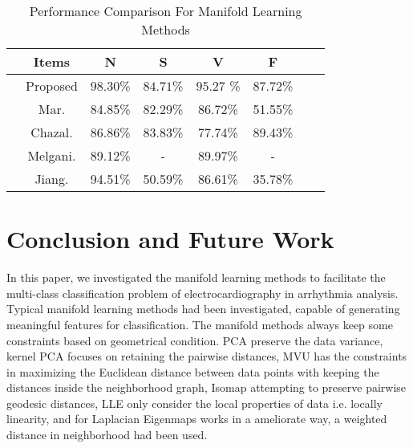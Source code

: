 \documentclass[journal]{IEEEtran}
\begin{document}
\begin{table}[!htbp]
\begin{center}
\begin{threeparttable}
\caption{Performance Comparison For Manifold Learning Methods}
\label{table1}
\begin{tabular}{cccccccc}
\hline
&  Items & N & S & V & F   \\
\hline

&Proposed &$\bm{98.30}$\% & $\bm{84.71}$\% & $\bm{95.27}$ \%& $\bm{87.72}$\%\\
& Mar. \cite{mar}  &84.85\% & 82.29\% & 86.72\% &51.55\%      \\


& Chazal. \cite{chaza} &86.86\% & 83.83\%  & 77.74\% & 89.43\%      \\

& Melgani.\cite{melgan}  &89.12\% & -  & 89.97\%  & -       \\

& Jiang.\cite{jiang}  & 94.51\% & 50.59\%  & 86.61\% & 35.78\%       \\


\hline
\end{tabular}
\end{threeparttable}
\end{center}
\end{table}
     
     


%
%

\section{Conclusion and Future Work}
In this paper, we investigated the manifold learning methods to facilitate the multi-class classification problem of electrocardiography in arrhythmia analysis.
Typical manifold learning methods had been investigated, capable of generating meaningful features for classification.
The manifold methods always keep some constraints based on geometrical condition.
PCA preserve the data variance, kernel PCA focuses on retaining the pairwise distances, MVU has the constraints in maximizing the Euclidean distance between data points with keeping the distances inside the neighborhood graph, Isomap attempting to preserve pairwise geodesic distances, LLE only consider the local properties of data i.e. locally linearity, and for Laplacian Eigenmaps works in a ameliorate way, a weighted distance in neighborhood had been used.
\end{document}
